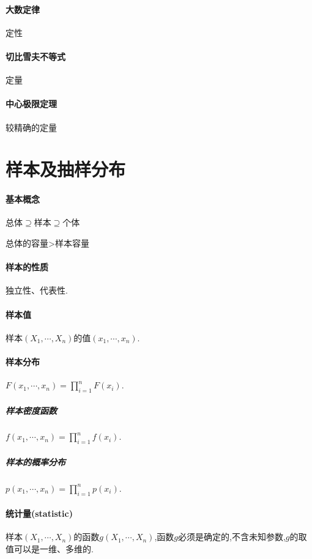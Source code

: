 \documentclass[UTF8]{ctexart}
\begin{document}
\begin{tcolorbox}[colframe=white!60!black,title=\bf{Tips}]
\paragraph{大数定律}定性
\paragraph{切比雪夫不等式}定量
\paragraph{中心极限定理}较精确的定量
\end{tcolorbox}

\newpage

\section{样本及抽样分布}

\paragraph{基本概念}总体$\supseteq $样本$\supseteq $个体

\qquad \quad 总体的容量>样本容量

\paragraph{样本的性质}独立性、代表性.
\paragraph{样本值}样本$(X_1,\cdots,X_n)$的值$(x_1,\cdots,x_n)$.
\paragraph{样本分布}$F(x_1,\cdots,x_n)=\prod_{i=1}^nF(x_i).$
\subparagraph{样本密度函数}$f(x_1,\cdots,x_n)=\prod_{i=1}^nf(x_i).$
\subparagraph{样本的概率分布}$p(x_1,\cdots,x_n)=\prod_{i=1}^np(x_i).$
\paragraph{统计量(statistic)}样本$(X_1,\cdots,X_n)$的函数$g(X_1,\cdots,X_n)$,函数$g$必须是确定的,不含未知参数,$g$的取值可以是一维、多维的.
\end{document}
